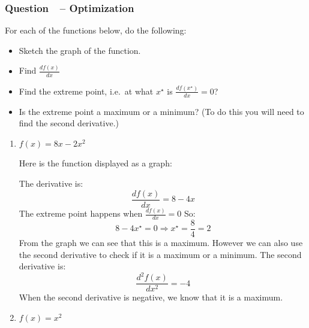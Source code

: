 \documentclass[12pt]{article}
\newcounter{question}[section]
\newcommand{\question}[1]{\refstepcounter{question}
  \subsubsection*{Question~\thequestion~-- #1}}
\newenvironment{subquestions}{
  \begin{enumerate}[label=(\roman*)]}{\end{enumerate}}
\begin{document}
\question{Optimization}
For each of the functions below, do the following:
\begin{itemize}
  \item Sketch the graph of the function.
  \item Find $\frac{df\left( x \right)}{dx}$
  \item Find the extreme point, i.e.~at what $x^{\star}$ is $\frac{df\left(
    x^{\star} \right)}{dx}=0$?
  \item Is the extreme point a maximum or a minimum? (To do this you will need
    to find the second derivative.)
\end{itemize}
\begin{subquestions}
  \item $f\left( x \right) = 8x - 2x^2$

      \textcolor{solution-color}{
        Here is the function displayed as a graph: \\
        \begin{center}
        \end{center}
        The derivative is:
        \[\frac{df\left( x \right)}{dx}=8 - 4x \]
        The extreme point happens when $\frac{df\left( x \right)}{dx}=0$
        So:
        \[
          8 - 4x^\star =0 \Rightarrow x^\star = \frac{8}{4} = 2
        \]
        From the graph we can see that this is a maximum. However we can also
        use the second derivative to check if it is a maximum or a minimum. The
        second derivative is:
        \[\frac{d^2f\left( x \right)}{dx^2}=- 4 \]
        When the second derivative is negative, we know that it is a maximum.
      }
  \item $f\left( x \right) = x^2$


\end{subquestions}
\end{document}
